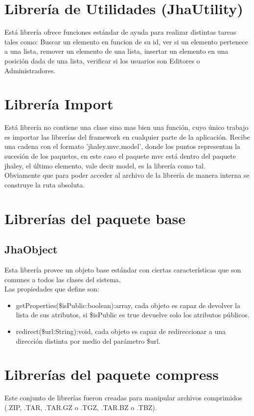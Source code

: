 \section{Librer\'ia de Utilidades (JhaUtility)}
Est\'a librer\'ia ofrece funciones est\'andar de ayuda para realizar distintas tareas tales como: Buscar un elemento en funcion de su id, ver si un elemento pertenece a una lista, remover un elemento de una lista, insertar un elemento en una posici\'on dada de una lista, verificar si los usuarios son Editores o Administradores.

\section{Librer\'ia Import}
Est\'a librer\'ia no contiene una clase sino mas bien una funci\'on, cuyo \'unico trabajo es importar las librer\'ias del framework en cualquier parte de la aplicaci\'on. Recibe una cadena con el formato \textsf{'jhaley.mvc.model'}, donde los puntos representan la sucesi\'on de los paquetes, en este caso el paquete \textsf{mvc} est\'a dentro del paquete \textsf{jhaley}, el \'ultimo elemento, vale decir \textsf{model}, es la librer\'ia como tal.\\
Obviamente que para poder acceder al archivo de la librer\'ia de manera interna se construye la ruta absoluta.

\section{Librer\'ias del paquete \textsf{base}}
\subsection{JhaObject}
Esta librer\'ia provee un objeto base est\'andar con ciertas caracter\'isticas que son comunes a todos las clases del sistema.\\Las propiedades que define son: 
\begin{itemize}
\item \textsf{getProperties(\$isPublic:boolean):array}, cada objeto es capaz de devolver la lista de sus atributos, si \textsf{\$isPublic} es \textsf{true} devuelve solo los atributos p\'ublicos.
\item \textsf{redirect(\$url:String):void}, cada objeto es capaz de redireccionar a una direcci\'on distinta por medio del par\'ametro \textsf{\$url}.
\end{itemize}

\section{Librer\'ias del paquete \textsf{compress}}
Este conjunto de librer\'ias fueron creadas para manipular archivos comprimidos (.ZIP, .TAR, .TAR.GZ o .TGZ, .TAR.BZ o .TBZ).
